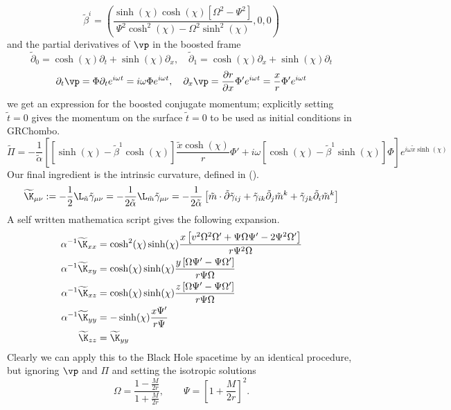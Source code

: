 \[ \tilde{\beta}^i = \left(\frac{\sinh (\chi)  \cosh (\chi)  \left[\Omega ^2-\Psi ^2\right]}{\Psi ^2 \cosh
   ^2(\chi) -\Omega ^2 \sinh ^2(\chi) },0,0\right)\]
and the partial derivatives of $\vp$ in the boosted frame
\[ \tilde{\partial}_{0} = \cosh(\chi) \partial_t + \sinh(\chi) \partial_x,\quad 
\tilde{\partial}_{1} = \cosh(\chi) \partial_x + \sinh(\chi) \partial_t\] 
 \[\partial_t\vp =\Phi\partial_te^{i\omega t} =i\omega \Phi e^{i\omega t},\quad
 \partial_x\vp =\frac{\partial r}{\partial x}\Phi'e^{i\omega t} = \frac{x}{r}\Phi'e^{i\omega t} \]
we get an expression for the boosted conjugate momentum; explicitly setting $\tilde{t}=0$ gives the momentum on the surface $\tilde{t}=0$ to be used as initial conditions in GRChombo. 
\begin{equation} \widetilde{\Pi} = -\frac{1}{\tilde{\alpha}}\left[  \left[ \sinh(\chi)-\tilde{\beta}^1 \cosh(\chi)\right]\frac{\tilde{x}\cosh(\chi)}{r}\Phi' + i\omega \left[ \cosh(\chi)-\tilde{\beta}^1\sinh(\chi)\right]\Phi\right]e^{i\omega \tilde{x}\sinh(\chi)}\end{equation}
Our final ingredient is the intrinsic curvature, defined in ().
\[ \widetilde{\K}_{\mu\nu} := -\frac{1}{2}\L_{\tilde{n}}\tilde{\gamma}_{\mu\nu} =-\frac{1}{2\tilde{\alpha}}\L_{\tilde{m}}\tilde{\gamma}_{\mu\nu} = -\frac{1}{2\tilde{\alpha}}\left[ \tilde m \cdot \tilde{\partial}\tilde{\gamma}_{ij} +  \tilde{\gamma}_{ik}\tilde{\partial}_j \tilde{m}^k +\tilde{\gamma}_{jk}\tilde{\partial}_i \tilde{m}^k\right]\]
A self written mathematica script gives the following expansion.
\begin{align}\alpha^{-1} \widetilde{\K}_{xx} &= \cosh^2(\chi)\sinh(\chi)\frac{x \left[v^2 \Omega^2 \Omega'+\Psi \Omega \Psi'-2 \Psi^2 \Omega'\right]}{r \Psi^2 \Omega}\\
 \alpha^{-1} \widetilde{\K}_{xy} &= \cosh(\chi)\sinh(\chi)\frac{ y \left[\Omega \Psi'- \Psi \Omega'\right]}{r \Psi \Omega }\\
 \alpha^{-1} \widetilde{\K}_{xz} &= \cosh(\chi)\sinh(\chi)\frac{ z \left[\Omega \Psi'- \Psi \Omega'\right]}{r \Psi \Omega }\\
 \alpha^{-1} \widetilde{\K}_{yy} &= -\sinh(\chi)\frac{ x \Psi'}{ r \Psi }\\
\widetilde{\K}_{zz}&=\widetilde{\K}_{yy} \end{align}
Clearly we can apply this to the Black Hole spacetime by an identical procedure, but ignoring $\vp$ and $\Pi$ and setting the isotropic solutions
\[ \Omega = \frac{1-\frac{M}{2r}}{1+\frac{M}{2r}}, \quad  \quad \Psi = \left[1+\frac{M}{2r}\right]^2.\]
 
